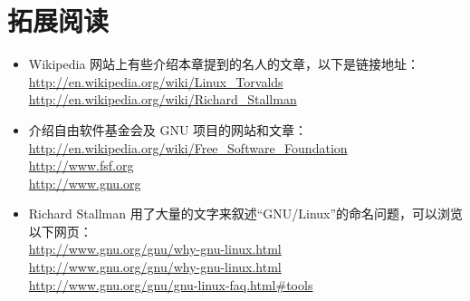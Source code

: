 \section{拓展阅读} %
\label{sec:拓展阅读}

\begin{itemize}
	\item Wikipedia 网站上有些介绍本章提到的名人的文章，以下是链接地址：\\
	\url{http://en.wikipedia.org/wiki/Linux_Torvalds}\\
	\url{http://en.wikipedia.org/wiki/Richard_Stallman}
	\item 介绍自由软件基金会及 GNU 项目的网站和文章：\\
	\url{http://en.wikipedia.org/wiki/Free_Software_Foundation}\\
	\url{http://www.fsf.org}\\
	\url{http://www.gnu.org}
	\item Richard Stallman 用了大量的文字来叙述“GNU/Linux”的命名问题，可以浏览以下网页：\\
	\url{http://www.gnu.org/gnu/why-gnu-linux.html}\\
	\url{http://www.gnu.org/gnu/why-gnu-linux.html}\\
	\url{http://www.gnu.org/gnu/gnu-linux-faq.html#tools}
\end{itemize}
